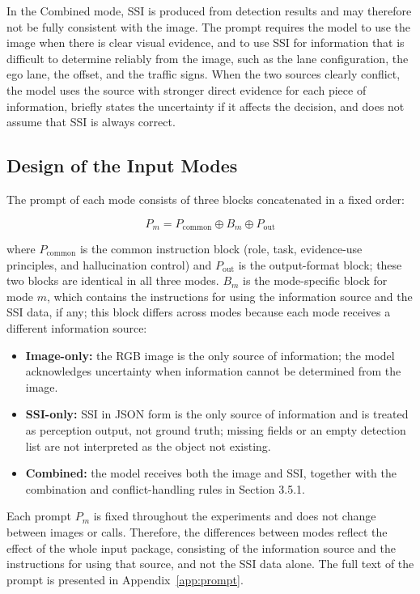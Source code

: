\documentclass[12pt,a4paper]{report}
\begin{document}
In the Combined mode, SSI is produced from detection results and may therefore not be fully consistent with the image. The prompt requires the model to use the image when there is clear visual evidence, and to use SSI for information that is difficult to determine reliably from the image, such as the lane configuration, the ego lane, the offset, and the traffic signs. When the two sources clearly conflict, the model uses the source with stronger direct evidence for each piece of information, briefly states the uncertainty if it affects the decision, and does not assume that SSI is always correct.

\subsection{Design of the Input Modes}

The prompt of each mode consists of three blocks concatenated in a fixed order:

\begin{equation}
P_m = P_{\mathrm{common}} \oplus B_m \oplus P_{\mathrm{out}}
\label{eq:3.16}
\end{equation}

where $P_{\mathrm{common}}$ is the common instruction block (role, task, evidence-use principles, and hallucination control) and $P_{\mathrm{out}}$ is the output-format block; these two blocks are identical in all three modes. $B_m$ is the mode-specific block for mode $m$, which contains the instructions for using the information source and the SSI data, if any; this block differs across modes because each mode receives a different information source:

\begin{itemize}
    \item \textbf{Image-only:} the RGB image is the only source of information; the model acknowledges uncertainty when information cannot be determined from the image.
    \item \textbf{SSI-only:} SSI in JSON form is the only source of information and is treated as perception output, not ground truth; missing fields or an empty detection list are not interpreted as the object not existing.
    \item \textbf{Combined:} the model receives both the image and SSI, together with the combination and conflict-handling rules in Section 3.5.1.
\end{itemize}

Each prompt $P_m$ is fixed throughout the experiments and does not change between images or calls. Therefore, the differences between modes reflect the effect of the whole input package, consisting of the information source and the instructions for using that source, and not the SSI data alone. The full text of the prompt is presented in Appendix~\ref{app:prompt}.
\end{document}
